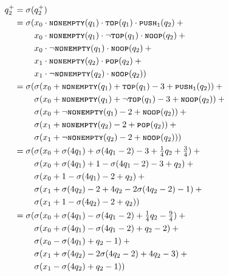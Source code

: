 \documentclass{beamer}
\newcommand{\pushone}{\texttt{\textsc{push}}\textsubscript{\texttt{1}}}
\newcommand{\nonempty}{\textsc{\texttt{nonempty}}}
\newcommand{\tos}{\textsc{\texttt{top}}}
\newcommand{\pop}{\textsc{\texttt{pop}}}
\newcommand{\noop}{\textsc{\texttt{noop}}}
\begin{document}
\begin{frame}
	\scriptsize
	\vspace{-1.5mm}
	\begin{align*}
		q_2^+=\sigma(&q_2^+)\\
		     =\sigma(&x_0\cdot\nonempty(q_1)\cdot\tos(q_1)\cdot\pushone(q_2)\:+\\
		             &x_0\cdot\nonempty(q_1)\cdot\lnot\tos(q_1)\cdot\noop(q_2)\:+\\
		             &x_0\cdot\lnot\nonempty(q_1)\cdot\noop(q_2)\:+\\
		             &x_1\cdot\nonempty(q_2)\cdot\pop(q_2)\:+\\
		             &x_1\cdot\lnot\nonempty(q_2)\cdot\noop(q_2))\\
		     =\sigma(&\sigma(x_0+\nonempty(q_1)+\tos(q_1)-3+\pushone(q_2))\:+\\
		             &\sigma(x_0+\nonempty(q_1)+\lnot\tos(q_1)-3+\noop(q_2))\:+\\
		             &\sigma(x_0+\lnot\nonempty(q_1)-2+\noop(q_2))\:+\\
		             &\sigma(x_1+\nonempty(q_2)-2+\pop(q_2))\:+\\
		             &\sigma(x_1+\lnot\nonempty(q_2)-2+\noop(q_2)))\\
		     =\sigma(&\sigma(x_0+\sigma(4q_1)+\sigma(4q_1-2)-3+\textstyle{\frac{1}{4}}q_2+\textstyle{\frac{3}{4}})\:+\\
		             &\sigma(x_0+\sigma(4q_1)+1-\sigma(4q_1-2)-3+q_2)\:+\\
		             &\sigma(x_0+1-\sigma(4q_1)-2+q_2)\:+\\
		             &\sigma(x_1+\sigma(4q_2)-2+4q_2-2\sigma(4q_2-2)-1)\:+\\
		             &\sigma(x_1+1-\sigma(4q_2)-2+q_2))\\
		     =\sigma(&\sigma(x_0+\sigma(4q_1)-\sigma(4q_1-2)+\textstyle{\frac{1}{4}}q_2-\textstyle{\frac{9}{4}})\:+\\
		             &\sigma(x_0+\sigma(4q_1)-\sigma(4q_1-2)+q_2-2)\:+\\
		             &\sigma(x_0-\sigma(4q_1)+q_2-1)\:+\\
		             &\sigma(x_1+\sigma(4q_2)-2\sigma(4q_2-2)+4q_2-3)\:+\\
		             &\sigma(x_1-\sigma(4q_2)+q_2-1))
	\end{align*}
\end{frame}
\end{document}
